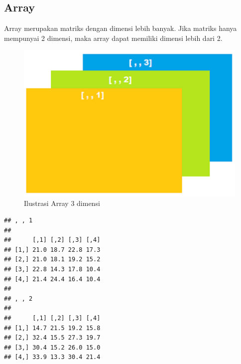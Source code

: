 \documentclass[]{book}
\newenvironment{Shaded}{\begin{snugshade}}{\end{snugshade}}
\newcommand{\DataTypeTok}[1]{\textcolor[rgb]{0.13,0.29,0.53}{#1}}
\newcommand{\DecValTok}[1]{\textcolor[rgb]{0.00,0.00,0.81}{#1}}
\newcommand{\KeywordTok}[1]{\textcolor[rgb]{0.13,0.29,0.53}{\textbf{#1}}}
\newcommand{\NormalTok}[1]{#1}
\newcommand{\OperatorTok}[1]{\textcolor[rgb]{0.81,0.36,0.00}{\textbf{#1}}}
\begin{document}
\hypertarget{array}{%
\subsection{Array}\label{array}}

Array merupakan matriks dengan dimensi lebih banyak. Jika matriks hanya mempunyai 2 dimensi, maka array dapat memiliki dimensi lebih dari 2.

\begin{figure}

{\centering \includegraphics[width=12in]{array} 

}

\caption{Ilustrasi Array 3 dimensi}\label{fig:unnamed-chunk-30}
\end{figure}

\begin{Shaded}
\end{Shaded}

\begin{verbatim}
## , , 1
## 
##      [,1] [,2] [,3] [,4]
## [1,] 21.0 18.7 22.8 17.3
## [2,] 21.0 18.1 19.2 15.2
## [3,] 22.8 14.3 17.8 10.4
## [4,] 21.4 24.4 16.4 10.4
## 
## , , 2
## 
##      [,1] [,2] [,3] [,4]
## [1,] 14.7 21.5 19.2 15.8
## [2,] 32.4 15.5 27.3 19.7
## [3,] 30.4 15.2 26.0 15.0
## [4,] 33.9 13.3 30.4 21.4
\end{verbatim}
\end{document}
